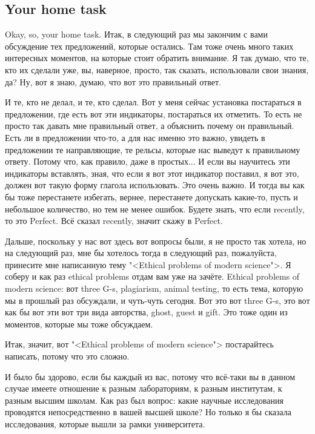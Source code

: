\documentclass[main.tex]{subfiles}
\begin{document}
\subsection{Your home task}

Okay, so, your home task.
Итак, в следующий раз мы закончим с вами обсуждение тех предложений, которые остались.
Там тоже очень много таких интересных моментов, на которые стоит обратить внимание.
Я так думаю, что те, кто их сделали уже, вы, наверное, просто, так сказать, использовали свои знания, да?
Ну, вот я знаю, думаю, что вот это правильный ответ.

И те, кто не делал, и те, кто сделал.
Вот у меня сейчас установка постараться в предложении, где есть вот эти индикаторы, постараться их отметить.
То есть не просто так давать мне правильный ответ, а объяснить почему он правильный.
Есть ли в предложении что-то, а для нас именно это важно, увидеть в предложении те направляющие, те рельсы, которые нас выведут к правильному ответу.
Потому что, как правило, даже в простых...
И если вы научитесь эти индикаторы вставлять, зная, что если я вот этот индикатор поставил, я вот это, должен вот такую форму глагола использовать.
Это очень важно.
И тогда вы как бы тоже перестанете избегать, вернее, перестанете допускать какие-то, пусть и небольшое количество, но тем не менее ошибок.
Будете знать, что если recently, то это Perfect.
Всё сказал recently, значит скажу в Perfect.

Дальше, поскольку у нас вот здесь вот вопросы были, я не просто так хотела, но на следующий раз, мне бы хотелось тогда в следующий раз, пожалуйста, принесите мне написанную тему "<Ethical problems of modern science">.
Я соберу и как раз ethical problems отдам вам уже на зачёте.
Ethical problems of modern science: вот three G-s, plagiarism, animal testing, то есть тема, которую мы в прошлый раз обсуждали, и чуть-чуть сегодня.
Вот это вот three G-s, это вот как бы вот эти вот три вида авторства, ghost, guest и gift.
Это тоже один из моментов, которые мы тоже обсуждаем.

Итак, значит, вот "<Ethical problems of modern science"> постарайтесь написать, потому что это сложно.

И было бы здорово, если бы каждый из вас, потому что всё-таки вы в данном случае имеете отношение к разным лабораториям, к разным институтам, к разным высшим школам.
Как раз был вопрос: какие научные исследования проводятся непосредственно в вашей высшей школе?
Но только я бы сказала исследования, которые вышли за рамки университета.
\end{document}
